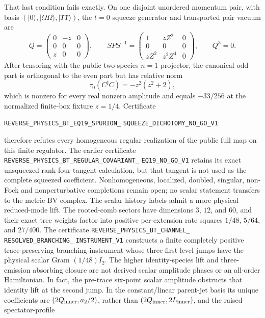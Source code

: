 \documentclass[11pt]{article}
\theoremstyle{definition}
\theoremstyle{remark}
\begin{document}
That last condition fails exactly.  On one disjoint unordered momentum pair,
with basis $(|0\rangle,|\Omega\Omega\rangle,|\Upsilon\Upsilon\rangle)$, the
$t=0$ squeeze generator and transported pair vacuum are
\[
 Q=\begin{pmatrix}0&-z&0\\0&0&0\\z&0&0\end{pmatrix},\qquad
 SPS^{-1}=\begin{pmatrix}
 1&zZ^2&0\\0&0&0\\zZ^2&z^2Z^4&0
 \end{pmatrix},\qquad Q^3=0.
\]
After tensoring with the public two-species $n=1$ projector, the canonical
odd part is orthogonal to the even part but has relative norm
\[
 \tau_0(C^\sharp C)=-z^2(z^2+2),
\]
which is nonzero for every real nonzero amplitude and equals $-33/256$ at the
normalized finite-box fixture $z=1/4$.  Certificate
\par\noindent
\texttt{REVERSE\_PHYSICS\_BT\_EQ19\_SPURION\_}
\allowbreak\texttt{SQUEEZE\_DICHOTOMY\_NO\_GO\_V1}
\par\noindent
therefore refutes every homogeneous regular realization of the public full
map on this finite regulator.  The earlier certificate
\texttt{REVERSE\_PHYSICS\_BT\_REGULAR\_COVARIANT\_}
\allowbreak\texttt{EQ19\_NO\_GO\_V1} retains its exact unsqueezed rank-four
tangent calculation, but that tangent is not used as the complete squeezed
coefficient.  Nonhomogeneous, localized, doubled, singular, non-Fock and
nonperturbative completions remain open; no scalar statement transfers to the
metric BV complex.
The scalar history labels admit a more physical reduced-mode lift.  The
rooted-comb sectors have dimensions $3$, $12$, and $60$, and their exact tree
weights factor into positive per-extension rate squares
$1/48$, $5/64$, and $27/400$.  The certificate
\texttt{REVERSE\_PHYSICS\_BT\_CHANNEL\_}
\allowbreak\texttt{RESOLVED\_BRANCHING\_}
\allowbreak\texttt{INSTRUMENT\_V1}
constructs a finite completely positive trace-preserving branching instrument
whose three first-level jumps have the physical scalar Gram $(1/48)I_2$.  The
higher identity-species lift and three-emission absorbing closure are not
derived scalar amplitude phases or an all-order Hamiltonian.  In fact, the
pre-trace six-point scalar amplitude obstructs that identity lift at the
second jump.  In the constant/linear parent-jet basis its unique coefficients
are $(2Q_{\rm inner},a_2/2)$, rather than
$(2Q_{\rm inner},2L_{\rm inner})$, and the raised spectator-profile
\end{document}
